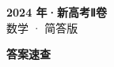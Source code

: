 \documentclass[zihao=-4, a4paper]{ctexart}
\begin{document}
\begin{center}
  {\Large\bfseries 2024 年·新高考Ⅱ卷}\\[4pt]
  {\large 数学 · 简答版}
\end{center}
\medskip
{}

\clearpage
{}
\begin{center}{\Large\bfseries 答案速查}\end{center}
\medskip

\end{document}
